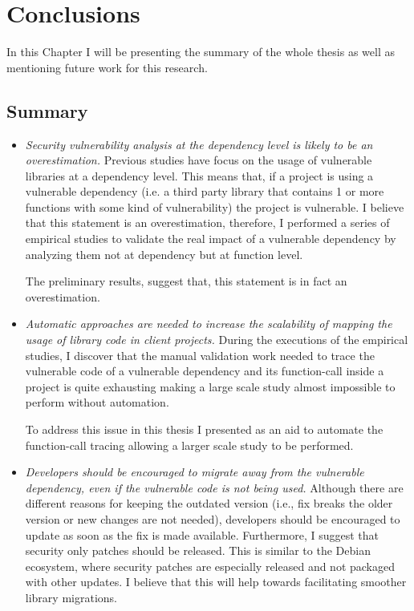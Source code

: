 \chapter{Conclusions}
\label{sec:conclusions}

In this Chapter I will be presenting the summary of the whole thesis as well as mentioning future work for this research.

\section{Summary}
\begin{itemize}
    \item \textit{Security vulnerability analysis at the dependency level is likely to be an overestimation.}
    Previous studies have focus on the usage of vulnerable libraries at a dependency level. This means that, if a project is using a vulnerable dependency (i.e. a third party library that contains 1 or more functions with some kind of vulnerability) the project is vulnerable. I believe that this statement is an overestimation, therefore, I performed a series of empirical studies to validate the real impact of a vulnerable dependency by analyzing them not at dependency but at function level.
    
    The preliminary results, suggest that, this statement is in fact an overestimation. 

    \item \textit{Automatic approaches are needed to increase the scalability of mapping the usage of library code in client projects. }
    During the executions of the empirical studies, I discover that the manual validation work needed to trace the vulnerable code of a vulnerable dependency and its function-call inside a project is quite exhausting making a large scale study almost impossible to perform without automation.
    
    To address this issue in this thesis I presented \tool[] as an aid to automate the function-call tracing allowing a larger scale study to be performed.
    
    \item \textit{Developers should be encouraged to migrate away from the vulnerable dependency, even if the vulnerable code is not being used.}
    Although there are different reasons for keeping the outdated version (i.e., fix breaks the older version or new changes are not needed), developers should be encouraged to update as soon as the fix is made available.
    Furthermore, I suggest that security only patches should be released.
    This is similar to the Debian ecosystem, where security patches are especially released and not packaged with other updates.
    I believe that this will help towards facilitating smoother library migrations.
\end{itemize}

